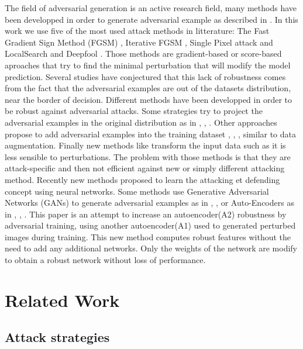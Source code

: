 \documentclass[12pt]{article}
\begin{document}
The field of adversarial generation is an active research field, many methods have been developped in order to generate adversarial example as described in \cite{yuan_adversarial_2017}. 
In this work we use five of the most used attack methods in litterature: 
The Fast  Gradient Sign  Method  (FGSM)  \cite{goodfellow_explaining_2014}, Iterative FGSM \cite{kurakin_adversarial_2016},  Single Pixel attack and LocalSearch \cite{narodytska_simple_2016} and  Deepfool  \cite{moosavi-dezfooli_deepfool:_2015}.
Those methods are gradient-based or score-based aproaches that try to find the minimal perturbation that will modify the model prediction.
Several studies have conjectured that this lack of robustness comes from the fact that the adversarial examples are out of the datasets distribution, near the border of decision. Different methods have been developped in order to be robust against adversarial attacks.
Some strategies try to project the adversarial examples in the original distribution as in  \cite{meng_magnet:_2017}, \cite{samangouei_defense-gan:_2018}, \cite{santhanam_defending_2018}. Other approaches propose to add adversarial examples into the training dataset \cite{szegedy_intriguing_2013}, \cite{goodfellow_explaining_2014}, \cite{moosavi-dezfooli_deepfool:_2015}, similar to data augmentation. Finally new methods like \cite{munusamy_kabilan_vectordefense:_2018} transform the input data such as it is less sensible to perturbations. The problem with those methods is that they are attack-specific and then not efficient against new or simply different attacking method. Recently new methods proposed to learn the attacking et defending concept using neural networks. Some methods use Generative Adversarial Networks (GANs) to generate adversarial examples as in \cite{samangouei_defense-gan:_2018}, \cite{shen_ape-gan:_2017}, \cite{lee_generative_2017} or Auto-Encoders as in \cite{folz_adversarial_2018}, \cite{srinivasan_counterstrike:_2018}, \cite{baluja_learning_nodate}. This paper is an attempt to increase an autoencoder(A2) robustness by adversarial training, using another autoencoder(A1) used to generated perturbed images during training. This new method computes robust features without the need to add any additional networks. Only the weights of the network are modify to obtain a robust network without loss of performance.
 
\section{Related Work}
\subsection{Attack strategies}
\end{document}
